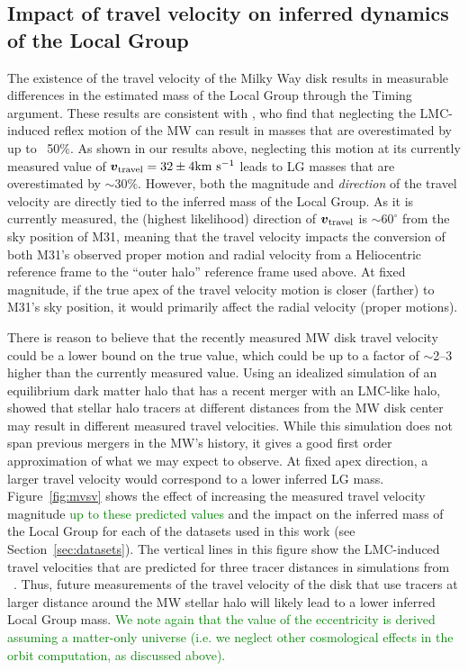 \documentclass[twocolumn]{aastex631}
\newcommand{\add}[1]{\textcolor{green}{#1}}
\newcommand{\bov}{\ensuremath{\boldsymbol{v}}}
\newcommand{\vtrav}{\ensuremath{\bov_{\rm travel}}}
\begin{document}
\subsection{Impact of travel velocity on inferred dynamics of the Local Group}
\label{sec:discussion-impact}
The existence of the travel velocity of the Milky Way disk
results in measurable differences in the estimated mass of the Local Group
through the Timing argument.
These results are consistent with \cite{Erkal2020}, who find that neglecting the
LMC-induced reflex motion of the MW can result in masses that are overestimated
by up to ~50\%.
As shown in our results above, neglecting this motion at its currently measured
value of $\vtrav=32\pm4\kms$
\citep{Petersen2021} leads to LG masses that are overestimated by $\sim30\%$.
However, both the magnitude and \emph{direction} of the travel velocity are
directly tied to the inferred mass of the Local Group.
As it is currently measured, the (highest likelihood) direction of $\vtrav$
is $\sim$$60^\circ$ from the sky position of M31, meaning that the travel
velocity impacts the conversion of both M31's observed proper motion and radial
velocity from a Heliocentric reference frame to the ``outer halo'' reference
frame used above.
At fixed magnitude, if the true apex of the travel velocity motion is closer
(farther) to M31's sky position, it would primarily affect the radial velocity
(proper motions).

There is reason to believe that the recently measured MW disk travel velocity
could be a lower bound on the true value, which could be up to a factor of
$\sim$2--3 higher than the currently measured value.
Using an idealized simulation of an equilibrium dark matter halo that has a
recent merger with an LMC-like halo, \cite{Garavito-Camargo2021b} showed that
stellar halo tracers at different distances from the MW disk center may result
in different measured travel velocities.
While this simulation does not span previous mergers in the MW's history, it
gives a good first order approximation of what we may expect to observe.
At fixed apex direction, a larger travel velocity would correspond to a lower
inferred LG mass.
Figure~\ref{fig:mvsv} shows the effect of increasing the measured travel
velocity magnitude \add{up to these predicted values} and the impact on the
inferred mass of the Local Group for
each of the datasets used in this work (see Section~\ref{sec:datasets}).
The vertical lines in this figure show the LMC-induced travel velocities that
are predicted for three tracer distances in simulations from
~\cite{Garavito-Camargo2021b}.
Thus, future measurements of the travel velocity of the disk that use tracers at
larger distance around the MW stellar halo will likely lead to a lower inferred
Local Group mass.
\add{We note again that the value of the eccentricity is derived assuming a matter-only universe (i.e. we neglect other cosmological effects in the orbit computation, as discussed above).}
\end{document}
